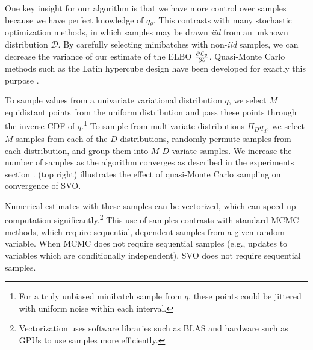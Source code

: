 One key insight for our algorithm is that we have more control over
samples because we have perfect knowledge of $q_\theta$.  This
contrasts with many stochastic optimization methods, in which samples
may be drawn \emph{iid} from an unknown distribution $\mathcal{D}$.
By carefully selecting minibatches with non-\emph{iid} samples, we can
decrease the variance of our estimate of the ELBO $\frac{\partial  \mathcal{L}_\theta
}{\partial \theta}$.  Quasi-Monte Carlo methods such as the Latin hypercube
design have been developed for exactly this purpose
\cite{tang:1993,owen:1998,niederreiter:1992}.

To sample values from a univariate variational distribution $q$, we
select $M$ equidistant points from the uniform distribution and pass
these points through the inverse CDF of $q$.\footnote{For a truly
  unbiased minibatch sample from $q$, these points could be jittered
  with uniform noise within each interval.} To sample from
multivariate distributions $\Pi_D q_d$, we select $M$ samples from
each of the $D$ distributions, randomly permute samples from each
distribution, and group them into $M$ $D$-variate samples. We increase
the number of samples as the algorithm converges as described in the
experiments section
\cite{wei:1990}.  (top
right) illustrates the effect of quasi-Monte Carlo sampling on
convergence of SVO.

Numerical estimates with these samples can be vectorized, which can
speed up computation significantly.\footnote{Vectorization uses
  software libraries such as BLAS and hardware such as GPUs to use
  samples more efficiently.}  This use of samples contrasts with
standard MCMC methods, which require sequential, dependent samples
from a given random variable.  When MCMC does not require sequential
samples (e.g., updates to variables which are conditionally
independent), SVO does not require sequential samples.

